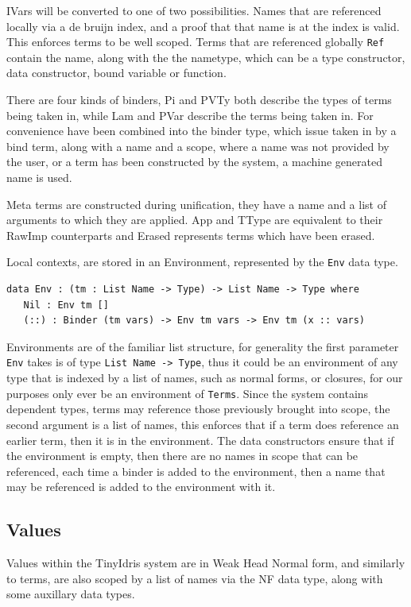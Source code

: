 \documentclass[a4paper]{article}
\begin{document}
IVars will be converted to one of two possibilities. Names that are
referenced locally via a de bruijn index, and a proof that that name
is at the index is valid. This enforces terms to be well scoped. Terms 
that are referenced globally \texttt{Ref} contain the name, along with the the
nametype, which can be a type constructor, data constructor, bound 
variable or function. 

There are four kinds of binders, Pi and PVTy both describe the types 
of terms being taken in, while Lam and PVar describe the terms being
taken in. For convenience have been combined into the binder type, 
which issue taken in by a bind term, along with a name and a scope,
where a name was not provided by the user, or a term has been 
constructed by the system, a machine generated name is used. 

Meta terms are constructed during unification, they have a name and a
list of arguments to which they are applied. App and TType are 
equivalent to their RawImp counterparts and Erased represents
terms which have been erased.

Local contexts, are stored in an Environment, represented by the \texttt{Env}
data type.

\begin{center}
\begin{verbatim}
data Env : (tm : List Name -> Type) -> List Name -> Type where
   Nil : Env tm []
   (::) : Binder (tm vars) -> Env tm vars -> Env tm (x :: vars)
\end{verbatim}
\end{center}

Environments are of the familiar list structure, for generality the 
first parameter \texttt{Env} takes is of type \texttt{List Name -> Type}, thus it 
could be an environment of any type that is indexed by a list of names,
such as normal forms, or closures, for our purposes only ever be an 
environment of \texttt{Terms}. Since the system contains dependent types, 
terms may reference those previously brought into scope, the second
argument is a list of names, this enforces that if a term does 
reference an earlier term, then it is in the environment. The data 
constructors ensure that if the environment is empty, then there are 
no names in scope that can be referenced, each time a binder is added
to the environment, then a name that may be referenced is added to the 
environment with it.  

\subsection{Values}
\label{sec:orgcaa457d}
Values within the TinyIdris system are in Weak Head Normal form, and 
similarly to terms, are also scoped by a list of names via the NF data
type, along with some auxillary data types. 
\end{document}
